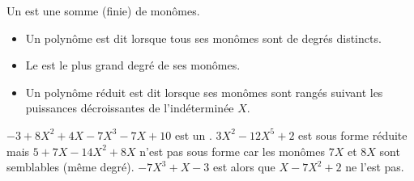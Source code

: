 \begin{Definition}[Polynôme]
    Un est une somme (finie) de monômes.
    
    \begin{itemize}
        \item Un polynôme est dit lorsque tous ses monômes sont de degrés distincts.
        \item Le est le plus grand degré de ses monômes.
        
        \item Un polynôme réduit est dit lorsque ses monômes sont rangés suivant les puissances décroissantes de l'indéterminée $X$.
        
    \end{itemize}
\end{Definition}

\begin{Exemple}[Polynômes]
    \begin{tcbenumerate}
        \tcbitem $-3+8X^2+4X-7X^3-7X+10$ est un .
        \tcbitem $3X^2-12X^5 +2$ est sous forme réduite mais $5+7X-14X^2+8X$ n'est pas sous forme  car les monômes $7X$ et $8X$ sont semblables (même degré).
        \tcbitem $-7X^3+X-3$ est  alors que $X-7X^2+2$ ne l'est pas.
    \end{tcbenumerate}
\end{Exemple}
